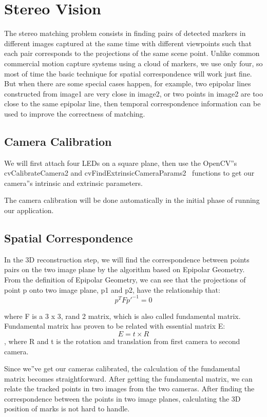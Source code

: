 \documentclass[10pt,twocolumn,letterpaper]{article}
\begin{document}

\section{Stereo Vision}
The stereo matching problem consists in finding pairs of detected 
markers in different images captured at the same time with different 
viewpoints such that each pair corresponds to the projections of the
 same scene point. Unlike common commercial motion capture systems 
using a cloud of markers, we use only four, so most of time the basic
 technique for spatial correspondence will work just fine. But when there 
are some special cases happen, for example, two epipolar lines constructed
from image1 are very close in image2, or two points in image2 are too close
to the same epipolar line, then temporal correspondence information can 
be used to improve the correctness of matching.

\subsection{Camera Calibration}
We will first attach four LEDs on a square plane, 
then use the OpenCV''s cvCalibrateCamera2 and 
cvFindExtrinsicCameraParams2~\cite{Zhang00} 
functions to get our camera''s intrinsic and extrinsic parameters.

The camera calibration will be done automatically 
in the initial phase of running our application.

\subsection{Spatial Correspondence}
In the 3D reconstruction step, we will find the 
correspondence between points pairs on the two image 
plane by the algorithm based on Epipolar Geometry. 
From the definition of Epipolar Geometry, 
we can see that the projections of point p onto 
two image plane, p1 and p2, have the relationship 
that:$$p^{T}Fp'^{-1} = 0$$

where F is a 3 x 3, rand 2 matrix, which is also 
called fundamental matrix\cite{Faugeras92}. Fundamental matrix has 
proven to be related with essential matrix E:$$E = t\times R$$, 
where R and t is the rotation and translation from first camera to second camera.

Since we''ve get our cameras calibrated, the calculation of 
the fundamental matrix becomes straightforward. After 
getting the fundamental matrix, we can relate the 
tracked points in two images from the two cameras. 
After finding the correspondence between the points 
in two image planes, calculating the 3D position of marks is not hard to handle. 
\end{document}
